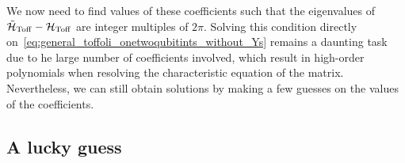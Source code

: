 We now need to find values of these coefficients such that the eigenvalues of $\tilde{\mathcal{H}}_{\operatorname{Toff}}-\mathcal{H}_{\operatorname{Toff}}$ are integer multiples of $2\pi$.
Solving this condition directly on~\cref{eq:general_toffoli_onetwoqubitints_without_Ys} remains a daunting task due to he large number of coefficients involved, which result in high-order polynomials when resolving the characteristic equation of the matrix.
Nevertheless, we can still obtain solutions by making a few guesses on the values of the coefficients.


\subsection{A lucky guess}

